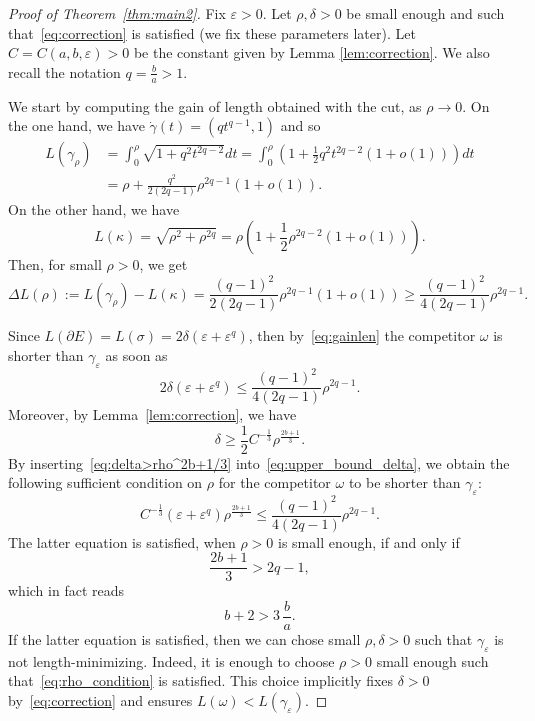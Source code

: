 \documentclass[12pt]{amsart}
\theoremstyle{plain}
\theoremstyle{definition}
\theoremstyle{remark}
\numberwithin{equation}{section}
\newcommand{\<}{\langle}
\renewcommand{\>}{\rangle}
\newcommand{\e}{\varepsilon}
\newcommand{\s}{\sigma}
\newcommand{\0}{\theta}
\newcommand{\w}{\omega}
\renewcommand{\d}{\partial}
\renewcommand{\k}{\kappa}
\newcommand{\g}{\gamma}
\newcommand{\de}{\delta}
\newcommand{\De}{\Delta}
\newcommand{\1}{{-1}}
\renewcommand{\=}{\coloneqq}
\renewcommand{\.}{\dots}
\renewcommand{\-}{\cdot}
\renewcommand{\:}{\,:\,}
\renewcommand{\k}{\mathrm k}
\renewcommand{\k}{\kappa}
\theoremstyle{definition}
\begin{document}
\begin{proof}[Proof of Theorem~\ref{thm:main2}]
	Fix $\e>0$. Let $\rho,\de>0$ be small enough and such that~\eqref{eq:correction} is satisfied (we fix these parameters later). Let $C=C(a,b,\e)>0$ be the constant given by Lemma \ref{lem:correction}. We also recall the notation $q=\frac ba>1$.
	
	We start by computing the gain of length obtained with the cut, as $\rho\to0$. On the one hand, we have $\dot\g(t)=(qt^{q-1},1)$ and so
	\begin{equation}
		\label{eq:lengamma}
		\begin{split}
			L(\g_\rho)&=\int_0^\rho\sqrt{1+q^2t^{2q-2}}dt= \int_0^\rho\left(1+\frac12q^2t^{2q-2}(1+o(1))\right)dt\\
			&=\rho+\frac{q^2}{2(2q-1)}\rho^{2q-1}(1+o(1)).
		\end{split}
	\end{equation}
	On the other hand, we have
	\begin{equation}
		\label{eq:lenk}
		L(\k)=\sqrt{\rho^2+\rho^{2q}}=\rho\left(1+\frac{1}{2}\rho^{2q-2}(1+o(1))\right).
	\end{equation}
	Then, for small $\rho>0$, we get
	\begin{equation}
		\label{eq:gainlen}
		\De L(\rho) := L(\g_\rho) - L(\k) = \frac{(q-1)^2}{2(2q-1)}\rho^{2q-1}(1+o(1)) \geq 
		\frac{(q-1)^2}{4(2q-1)}\rho^{2q-1}.
	\end{equation}
	
	Since $L(\d E)=L(\s)=2\de(\e+\e^q)$, then by~\eqref{eq:gainlen} the competitor $\w$ is shorter than $\g_\e$ as soon as
	\begin{equation}
		\label{eq:upper_bound_delta}
		2\de(\e+\e^q)\leq \frac{(q-1)^2}{4(2q-1)}\rho^{2q-1}.
	\end{equation}
	Moreover, by Lemma~\ref{lem:correction}, we have 
	\begin{equation}
		\label{eq:delta>rho^2b+1/3}
		\de\geq \frac12C^{-\frac13}\rho^{\frac{2b+1}{3}}.
	\end{equation}
	By inserting~\eqref{eq:delta>rho^2b+1/3} into~\eqref{eq:upper_bound_delta}, we obtain the following sufficient condition on $\rho$ for the competitor $\w$ to be shorter than $\g_\e$:
	\begin{equation}
		\label{eq:rho_condition}
		C^{-\frac13}(\e+\e^q)\rho^{\frac{2b+1}{3}}\leq \frac{(q-1)^2}{4(2q-1)}\rho^{2q-1}.
	\end{equation}
	The latter equation is satisfied, when $\rho>0$ is small enough, if and only if
	\begin{equation}
		\frac{2b+1}{3}>2q-1,
	\end{equation}
	which in fact reads
	\begin{equation}
		\label{eq:final_ab}
		b+2>3\,\frac{b}{a}.
	\end{equation}
	If the latter equation is satisfied, then we can chose small $\rho,\de>0$ such that $\g_\e$ is not length-minimizing. Indeed, it is enough to choose $\rho>0$ small enough such that~\eqref{eq:rho_condition} is satisfied. This choice implicitly fixes $\de>0$ by~\eqref{eq:correction} and ensures $L(\w)<L(\g_\e)$. 
	

\end{proof}
\end{document}
